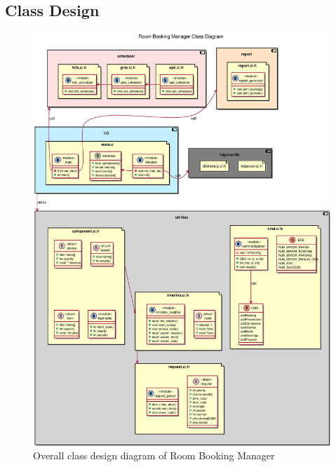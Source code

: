 \documentclass{article}
\begin{document}
        \subsection{Class Design}
            \begin{figure}[!htbp]
                \centering
                \includegraphics[scale=0.4]{../res/eps/class_diagram.eps}
                \caption{Overall class design diagram of Room Booking Manager}
            \end{figure}
\end{document}
